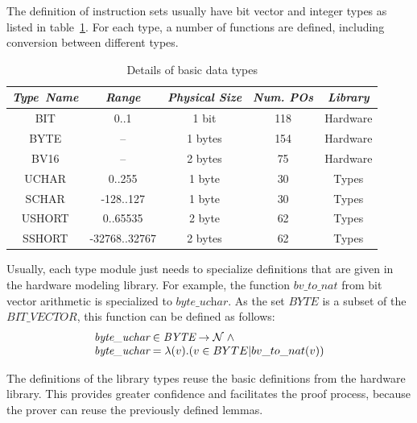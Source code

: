 \documentclass[a4paper]{llncs}
\begin{document}
The definition of instruction sets usually have bit vector and integer
types as listed in table~\ref{tab:types}. For each type, a number of
functions are defined, including conversion between different types.

\begin{table}[h]
\caption{Details of basic data types}
\label{tab:types}
\begin{center}
\begin{tabular}{|c|c|c|c|c|}
\hline
 \textit{Type\ Name} & \textit{Range} & \textit{Physical Size}  & \textit{Num. POs} & \textit{Library} \\\hline
 BIT & 0..1 & 1 bit &   118 & Hardware \\\hline 
 BYTE & -- & 1 bytes &  154 & Hardware \\\hline
 BV16 & -- & 2 bytes &  75 & Hardware \\ \hline
 UCHAR & 0..255 & 1 byte &  30 & Types \\\hline
 SCHAR & -128..127 & 1 byte & 30 & Types \\\hline 
 USHORT & 0..65535 & 2 byte & 62 & Types \\\hline
 SSHORT & -32768..32767 & 2 bytes & 62 & Types \\\hline 
\end{tabular}
\end{center}
\end{table}

Usually, each type module just needs to specialize definitions that
are given in the hardware modeling library.  For example, the function
$\textit{bv\_to\_nat}$ from bit vector arithmetic is specialized to
$\textit{byte\_uchar}$. As the set $\textit{BYTE}$ is a subset of the
$\textit{BIT\_VECTOR}$, this function can be defined as follows:
$$
\begin{array}{l}
\textit{byte\_uchar} \in \textit{BYTE} \fun \nat \land \\
\textit{byte\_uchar} = \lambda (v) . ( v \in BYTE | bv\_to\_nat(v) )
\end{array}
$$

The definitions of the library types reuse the basic definitions from
the hardware library. This provides greater confidence and facilitates
the proof process, because the prover can reuse the previously defined
lemmas.


%
\end{document}
